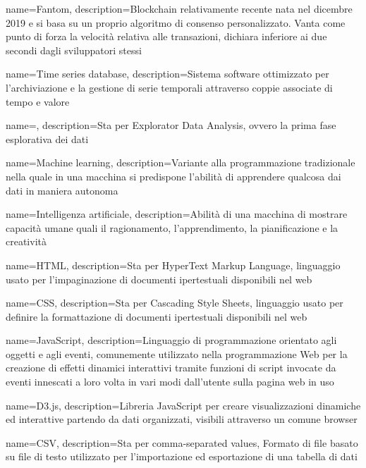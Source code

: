 {
	name={Fantom},
	description={Blockchain relativamente recente nata nel dicembre 2019 e si basa su un proprio algoritmo di consenso personalizzato. Vanta come punto di forza la velocità relativa alle transazioni, dichiara inferiore ai due secondi dagli sviluppatori stessi}
}

{
	name={Time series database},
	description={Sistema software ottimizzato per l'archiviazione e la gestione di serie temporali attraverso coppie associate di tempo e valore}
}

\newglossaryentry{}
{
	name={},
	description={Sta per Explorator Data Analysis, ovvero la prima fase esplorativa dei dati}
}

{
	name={Machine learning},
	description={Variante alla programmazione tradizionale nella quale in una macchina si predispone l'abilità di apprendere qualcosa dai dati in maniera autonoma}
}

{
	name={Intelligenza artificiale},
	description={Abilità di una macchina di mostrare capacità umane quali il ragionamento, l'apprendimento, la pianificazione e la creatività}
}

{
	name={HTML},
	description={Sta per HyperText Markup Language, linguaggio usato per l'impaginazione di documenti ipertestuali disponibili nel web}
}

{
	name={CSS},
	description={Sta per Cascading Style Sheets, linguaggio usato per definire la formattazione di documenti ipertestuali disponibili nel web}
}

{
	name={JavaScript},
	description={Linguaggio di programmazione orientato agli oggetti e agli eventi, comunemente utilizzato nella programmazione Web per la creazione di effetti dinamici interattivi tramite funzioni di script invocate da eventi innescati a loro volta in vari modi dall'utente sulla pagina web in uso}
}

{
	name={D3.js},
	description={Libreria JavaScript per creare visualizzazioni dinamiche ed interattive partendo da dati organizzati, visibili attraverso un comune browser}
}

{
	name={CSV},
	description={Sta per comma-separated values, Formato di file basato su file di testo utilizzato per l'importazione ed esportazione di una tabella di dati}
}

